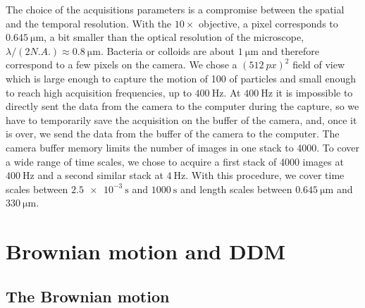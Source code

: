 \documentclass[%
 aip,
 jmp,%
 amsmath,amssymb,
reprint,%
]{revtex4-1}
\begin{document}
The choice of the acquisitions parameters is a compromise between the spatial and the temporal resolution. With the $10\times$ objective, a pixel corresponds to $\SI{0.645}{\micro\meter}$, a bit smaller than the optical resolution of the microscope, $\lambda/(2N.A.)\approx\SI{0.8}{\micro\meter} $. Bacteria or colloids are about $\SI{1}{\micro\meter}$ and therefore correspond to a few pixels on the camera. We chose a $(\SI{512}{px})^2$ field of view which is large enough to capture the motion of 100 of particles and small enough to reach high acquisition frequencies, up to $\SI{400}{\hertz}$. At $\SI{400}{\hertz}$ it is impossible to directly sent the data from the camera to the computer during the capture, so we have to temporarily save the acquisition on the buffer of the camera, and, once it is over, we send the data from the buffer of the camera to the computer. The camera buffer memory limits the number of images in one stack to 4000. To cover a wide range of time scales, we chose to acquire a first stack of 4000 images at $\SI{400}{\hertz}$ and a second similar stack at $\SI{4}{\hertz}$. With this procedure, we cover time scales between $\SI{2.5e-3}{\second}$ and $\SI{1000}{\second}$ and length scales between $\SI{0.645}{\micro\meter}$ and $\SI{330}{\micro\meter}$.

\section{Brownian motion and DDM}
\label{sec:BrownSection}

\subsection{The Brownian motion}
\end{document}

